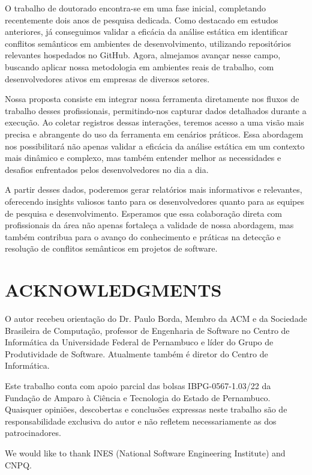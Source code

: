 \documentclass[sigconf,review]{acmart}
\begin{document}
O trabalho de doutorado encontra-se em uma fase inicial, completando recentemente dois anos de pesquisa dedicada. Como destacado em estudos anteriores, já conseguimos validar a eficácia da análise estática em identificar conflitos semânticos em ambientes de desenvolvimento, utilizando repositórios relevantes hospedados no GitHub. Agora, almejamos avançar nesse campo, buscando aplicar nossa metodologia em ambientes reais de trabalho, com desenvolvedores ativos em empresas de diversos setores.

Nossa proposta consiste em integrar nossa ferramenta diretamente nos fluxos de trabalho desses profissionais, permitindo-nos capturar dados detalhados durante a execução. Ao coletar registros dessas interações, teremos acesso a uma visão mais precisa e abrangente do uso da ferramenta em cenários práticos. Essa abordagem nos possibilitará não apenas validar a eficácia da análise estática em um contexto mais dinâmico e complexo, mas também entender melhor as necessidades e desafios enfrentados pelos desenvolvedores no dia a dia.

A partir desses dados, poderemos gerar relatórios mais informativos e relevantes, oferecendo insights valiosos tanto para os desenvolvedores quanto para as equipes de pesquisa e desenvolvimento. Esperamos que essa colaboração direta com profissionais da área não apenas fortaleça a validade de nossa abordagem, mas também contribua para o avanço do conhecimento e práticas na detecção e resolução de conflitos semânticos em projetos de software.

\section*{ACKNOWLEDGMENTS}
O autor recebeu orientação do Dr. Paulo Borda, Membro da ACM e da Sociedade Brasileira de Computação, professor de Engenharia de Software no Centro de Informática da Universidade Federal de Pernambuco e líder do Grupo de Produtividade de Software. Atualmente também é diretor do Centro de Informática.

Este trabalho conta com apoio parcial das bolsas IBPG-0567-1.03/22 da Fundação de Amparo à Ciência e Tecnologia do Estado de Pernambuco. Quaisquer opiniões, descobertas e conclusões expressas neste trabalho são de responsabilidade exclusiva do autor e não refletem necessariamente as dos patrocinadores.

We would like to thank INES (National Software Engineering Institute) and CNPQ.




\end{document}
